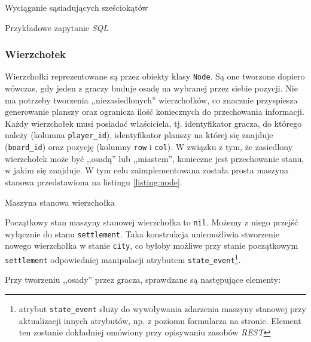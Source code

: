 \documentclass[a4paper,12pt]{article}
\begin{document}
\begin{listing}
  
  \caption{Wyciąganie sąsiadujących sześciokątów}
  \label{listing:hex}
\end{listing}

\begin{listing}
  
  \caption{Przykładowe zapytanie \emph{SQL}}
  \label{listing:find}
\end{listing}

\subsubsection{Wierzchołek}

Wierzchołki reprezentowane są przez obiekty klasy \texttt{Node}. Są
one tworzone dopiero wówczas, gdy jeden z graczy buduje osadę na
wybranej przez siebie pozycji. Nie ma potrzeby tworzenia
,,niezasiedlonych'' wierzchołków, co znacznie przyspiesza generowanie
planszy oraz ogranicza ilość koniecznych do przechowania
informacji. Każdy wierzchołek musi posiadać właściciela,
tj. identyfikator gracza, do którego należy (kolumna
\texttt{player\_id}), identyfikator planszy na której się znajduje
(\texttt{board\_id}) oraz pozycję (kolumny \texttt{row} i
\texttt{col}). W związku z tym, że zasiedlony wierzchołek może być
,,osadą'' lub ,,miastem'', konieczne jest przechowanie stanu, w jakim
się znajduje. W tym celu zaimplementowana została prosta maszyna
stanowa przedstawiona na listingu \ref{listing:node}.

\begin{listing}
  
  \caption{Maszyna stanowa wierzchołka}
  \label{listing:node}
\end{listing}

Początkowy stan maszyny stanowej wierzchołka to \texttt{nil}. Możemy z
niego przejść wyłącznie do stanu \texttt{settlement}. Taka konstrukcja
uniemożliwia stworzenie nowego wierzchołka w stanie \texttt{city}, co
byłoby możliwe przy stanie początkowym \texttt{settlement}
odpowiedniej manipulacji atrybutem
\texttt{state\_event}\footnote{atrybut \texttt{state\_event} służy do
  wywoływania zdarzenia maszyny stanowej przy aktualizacji innych
  atrybutów, np. z poziomu formularza na stronie. Element ten zostanie
  dokładniej omówiony przy opisywaniu zasobów \emph{REST}}.

Przy tworzeniu ,,osady'' przez gracza, sprawdzane są następujące
elementy:
\end{document}
